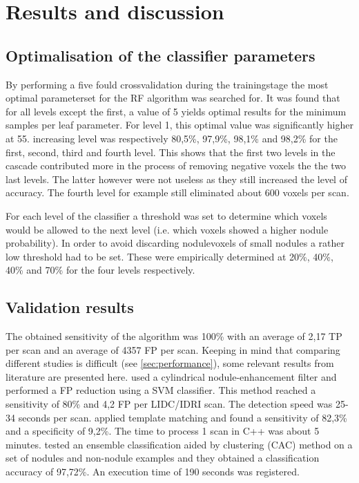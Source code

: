 \section{Results and discussion}
\subsection{Optimalisation of the classifier parameters}
By performing a five fould crossvalidation during the trainingstage the most
optimal parameterset for the RF algorithm was searched for.  It was found that
for all levels except the first, a value of 5 yields optimal results for the
minimum samples per leaf parameter. For level 1, this optimal value was
significantly higher at 55. %
increasing level was respectively 80,5\%, 97,9\%, 98,1\% and 98,2\% for the
first, second, third and fourth level. This shows that the first two levels in
the cascade contributed more in the process of removing negative voxels the the
two last levels. The latter however were not useless as they still increased the
level of accuracy. The fourth level for example still eliminated about 600
voxels per scan.

For each level of the classifier a threshold was set to determine which voxels
would be allowed to the next level (i.e. which voxels showed a higher nodule
probability). In order to avoid discarding nodulevoxels of small nodules
a rather low threshold had to be set. These were empirically determined at 20\%,
40\%, 40\% and 70\% for the four levels respectively.

 
\subsection{Validation results}
The obtained sensitivity of the algorithm was 100\% with an average of 2,17 TP
per scan and an average of 4357 FP per scan. %
Keeping in mind that comparing different studies is difficult (see
\ref{sec:performance}), some relevant results from literature are presented
here. \cite{teramoto} used a cylindrical nodule-enhancement filter and performed
a FP reduction using a SVM classifier. This method reached a sensitivity of 80\%
and 4,2 FP per LIDC/IDRI scan. The detection speed was 25-34 seconds per scan.
\cite{elbaz} applied template matching and found a sensitivity of 82,3\% and a
specificity of 9,2\%. The time to process 1 scan in C++ was about 5 minutes.
\cite{lee2010} tested an ensemble classification aided by clustering (CAC)
method on a set of nodules and non-nodule examples and they obtained a
classification accuracy of 97,72\%. An execution time of 190 seconds was
registered.

